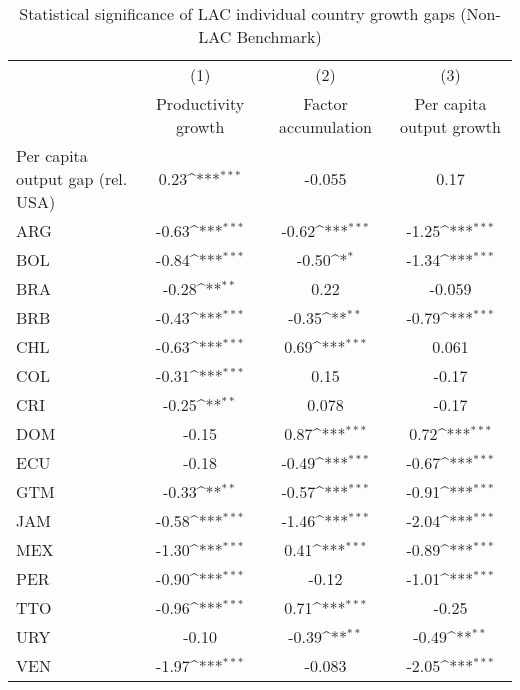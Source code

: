 \begin{table}[htbp]\centering
\def\sym#1{\ifmmode^{#1}\else\(^{#1}\)\fi}
\caption{Statistical significance of LAC individual country growth gaps (Non-LAC Benchmark)}
\begin{tabular}{l*{3}{c}}
\toprule
                &\multicolumn{1}{c}{(1)}&\multicolumn{1}{c}{(2)}&\multicolumn{1}{c}{(3)}\\
                &\multicolumn{1}{c}{Productivity growth}&\multicolumn{1}{c}{Factor accumulation}&\multicolumn{1}{c}{Per capita output growth}\\
\midrule
Per capita output gap (rel. USA)&     0.23\sym{***}&   -0.055         &     0.17         \\
ARG             &    -0.63\sym{***}&    -0.62\sym{***}&    -1.25\sym{***}\\
BOL             &    -0.84\sym{***}&    -0.50\sym{*}  &    -1.34\sym{***}\\
BRA             &    -0.28\sym{**} &     0.22         &   -0.059         \\
BRB             &    -0.43\sym{***}&    -0.35\sym{**} &    -0.79\sym{***}\\
CHL             &    -0.63\sym{***}&     0.69\sym{***}&    0.061         \\
COL             &    -0.31\sym{***}&     0.15         &    -0.17         \\
CRI             &    -0.25\sym{**} &    0.078         &    -0.17         \\
DOM             &    -0.15         &     0.87\sym{***}&     0.72\sym{***}\\
ECU             &    -0.18         &    -0.49\sym{***}&    -0.67\sym{***}\\
GTM             &    -0.33\sym{**} &    -0.57\sym{***}&    -0.91\sym{***}\\
JAM             &    -0.58\sym{***}&    -1.46\sym{***}&    -2.04\sym{***}\\
MEX             &    -1.30\sym{***}&     0.41\sym{***}&    -0.89\sym{***}\\
PER             &    -0.90\sym{***}&    -0.12         &    -1.01\sym{***}\\
TTO             &    -0.96\sym{***}&     0.71\sym{***}&    -0.25         \\
URY             &    -0.10         &    -0.39\sym{**} &    -0.49\sym{**} \\
VEN             &    -1.97\sym{***}&   -0.083         &    -2.05\sym{***}\\
\midrule

\end{tabular}
\end{table}

